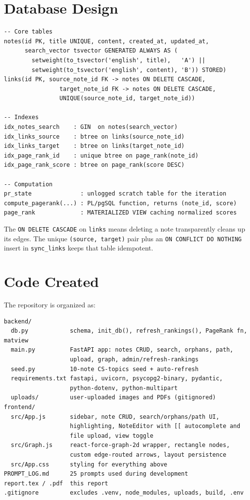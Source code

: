 \documentclass[11pt,a4paper]{article}
\begin{document}
\section{Database Design}

\begin{lstlisting}
-- Core tables
notes(id PK, title UNIQUE, content, created_at, updated_at,
      search_vector tsvector GENERATED ALWAYS AS (
        setweight(to_tsvector('english', title),   'A') ||
        setweight(to_tsvector('english', content), 'B')) STORED)
links(id PK, source_note_id FK -> notes ON DELETE CASCADE,
                target_note_id FK -> notes ON DELETE CASCADE,
                UNIQUE(source_note_id, target_note_id))

-- Indexes
idx_notes_search    : GIN  on notes(search_vector)
idx_links_source    : btree on links(source_note_id)
idx_links_target    : btree on links(target_note_id)
idx_page_rank_id    : unique btree on page_rank(note_id)
idx_page_rank_score : btree on page_rank(score DESC)

-- Computation
pr_state              : unlogged scratch table for the iteration
compute_pagerank(...) : PL/pgSQL function, returns (note_id, score)
page_rank             : MATERIALIZED VIEW caching normalized scores
\end{lstlisting}

The \texttt{ON DELETE CASCADE} on \texttt{links} means deleting a note transparently cleans up its edges. The unique \texttt{(source, target)} pair plus an \texttt{ON CONFLICT DO NOTHING} insert in \texttt{sync\_links} keeps that table idempotent.

\section{Code Created}

The repository is organized as:
\begin{lstlisting}
backend/
  db.py            schema, init_db(), refresh_rankings(), PageRank fn, matview
  main.py          FastAPI app: notes CRUD, search, orphans, path,
                   upload, graph, admin/refresh-rankings
  seed.py          10-note CS-topics seed + auto-refresh
  requirements.txt fastapi, uvicorn, psycopg2-binary, pydantic,
                   python-dotenv, python-multipart
  uploads/         user-uploaded images and PDFs (gitignored)
frontend/
  src/App.js       sidebar, note CRUD, search/orphans/path UI,
                   highlighting, NoteEditor with [[ autocomplete and
                   file upload, view toggle
  src/Graph.js     react-force-graph-2d wrapper, rectangle nodes,
                   custom edge-routed arrows, layout persistence
  src/App.css      styling for everything above
PROMPT_LOG.md      25 prompts used during development
report.tex / .pdf  this report
.gitignore         excludes .venv, node_modules, uploads, build, .env
\end{lstlisting}
\end{document}

